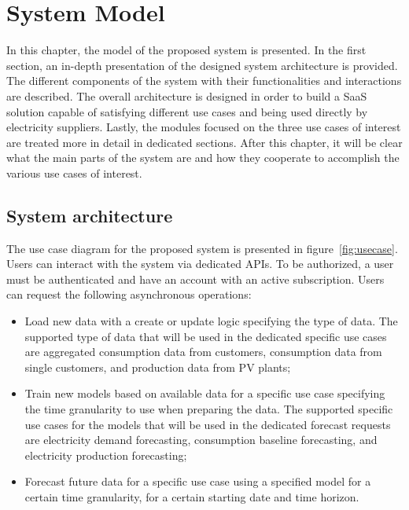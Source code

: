 \chapter{System Model}
\label{cha:system}
\vspace{0.4 cm}

In this chapter, the model of the proposed system is presented.
In the first section, an in-depth presentation of the designed system architecture is provided.
The different components of the system with their functionalities and interactions are described.
The overall architecture is designed in order to build a SaaS solution capable of satisfying different use cases and being used directly by electricity suppliers.
Lastly, the modules focused on the three use cases of interest are treated more in detail in dedicated sections.
After this chapter, it will be clear what the main parts of the system are and how they cooperate to accomplish the various use cases of interest.


\section{System architecture}
\label{sec:architecture}
\vspace{0.2 cm}

The use case diagram for the proposed system is presented in figure~\ref{fig:usecase}.
Users can interact with the system via dedicated APIs.
To be authorized, a user must be authenticated and have an account with an active subscription.
Users can request the following asynchronous operations:
\begin{itemize}
  \item Load new data with a create or update logic specifying the type of data. The supported type of data that will be used in the dedicated specific use cases are aggregated consumption data from customers, consumption data from single customers, and production data from PV plants;
  \item Train new models based on available data for a specific use case specifying the time granularity to use when preparing the data. The supported specific use cases for the models that will be used in the dedicated forecast requests are electricity demand forecasting, consumption baseline forecasting, and electricity production forecasting;
  \item Forecast future data for a specific use case using a specified model for a certain time granularity, for a certain starting date and time horizon.
\end{itemize}

